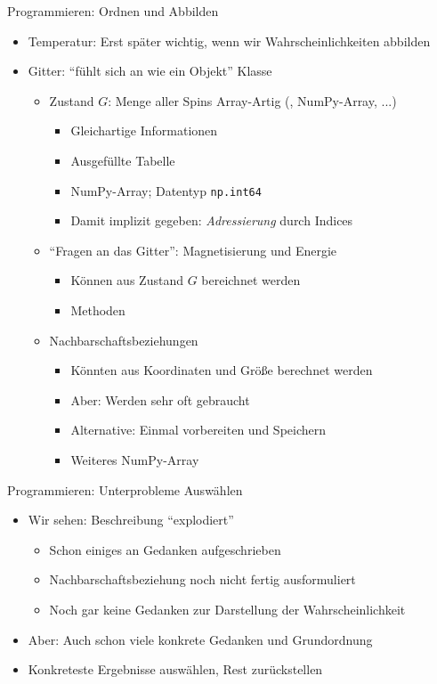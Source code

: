 \begin{frame}[fragile]{Programmieren: Ordnen und Abbilden}
%
\begin{itemize}
\item Temperatur: Erst später wichtig, wenn wir Wahrscheinlichkeiten abbilden
\item Gitter: \enquote{fühlt sich an wie ein Objekt} \Thus Klasse
	\begin{itemize}
	\item Zustand $G$: Menge aller Spins \Thus Array-Artig (, NumPy-Array, ...)
		\begin{itemize}
		\item Gleichartige Informationen
		\item Ausgefüllte Tabelle
		\item[\Thus] NumPy-Array; Datentyp \texttt{np.int64}
		\item Damit implizit gegeben: \emph{Adressierung} durch Indices
		\end{itemize}
	\item \enquote{Fragen an das Gitter}: Magnetisierung und Energie
		\begin{itemize}
		\item Können aus Zustand $G$ bereichnet werden
		\item[\Thus] Methoden
		\end{itemize}
	\item Nachbarschaftsbeziehungen
		\begin{itemize}
		\item Könnten aus Koordinaten und Größe berechnet werden
		\item Aber: Werden sehr oft gebraucht
		\item Alternative: Einmal vorbereiten und Speichern
		\item Weiteres NumPy-Array
		\end{itemize}
	\end{itemize}
\end{itemize}
%
\end{frame}


\begin{frame}{Programmieren: Unterprobleme Auswählen}
%
\begin{itemize}
\item Wir sehen: Beschreibung \enquote{explodiert} 
	\begin{itemize}
	\item Schon einiges an Gedanken aufgeschrieben
	\item Nachbarschaftsbeziehung noch nicht fertig ausformuliert
	\item Noch gar keine Gedanken zur Darstellung der Wahrscheinlichkeit
	\end{itemize}
\item Aber: Auch schon viele konkrete Gedanken und Grundordnung
\item[\Thus] Konkreteste Ergebnisse auswählen, Rest zurückstellen
\end{itemize}
%
\end{frame}

